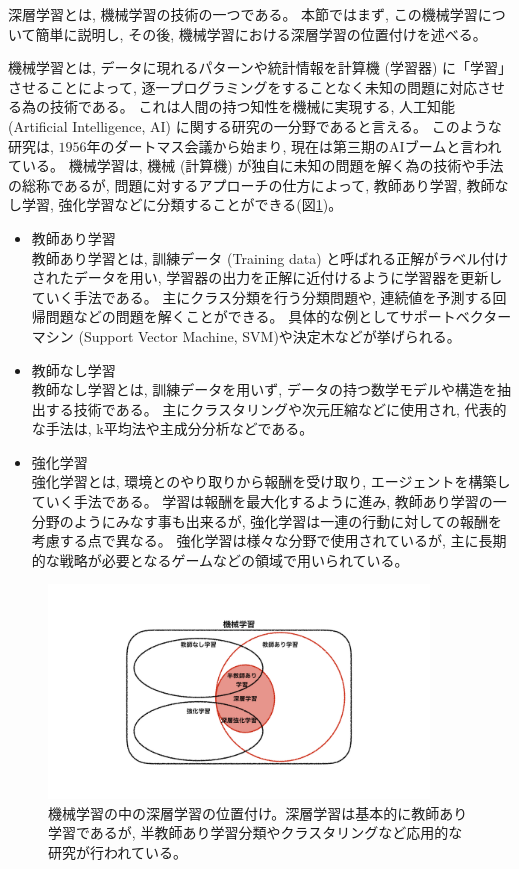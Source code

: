 深層学習とは, 機械学習の技術の一つである。
本節ではまず, この機械学習について簡単に説明し, その後, 機械学習における深層学習の位置付けを述べる。

機械学習とは, データに現れるパターンや統計情報を計算機 (学習器) に「学習」させることによって, 逐一プログラミングをすることなく未知の問題に対応させる為の技術である。
これは人間の持つ知性を機械に実現する, 人工知能 (Artificial Intelligence, AI) に関する研究の一分野であると言える。
このような研究は, $1956$年のダートマス会議\cite{Dartmouth}から始まり, 現在は第三期のAIブームと言われている。
機械学習は, 機械 (計算機) が独自に未知の問題を解く為の技術や手法の総称であるが, 問題に対するアプローチの仕方によって, 教師あり学習, 教師なし学習, 強化学習などに分類することができる(図\ref{1MachineLearning})。

\begin{itemize}
  \item 教師あり学習\\
  教師あり学習とは, 訓練データ (Training data) と呼ばれる正解がラベル付けされたデータを用い, 学習器の出力を正解に近付けるように学習器を更新していく手法である。
  主にクラス分類を行う分類問題や, 連続値を予測する回帰問題などの問題を解くことができる。
  具体的な例としてサポートベクターマシン (Support Vector Machine, SVM\cite{PatternRecognitionUsingGeneralizedPortraitMethod,TrainingAlgorithmforOptimalMarginClassifiers})や決定木などが挙げられる。
  \item 教師なし学習\\
  教師なし学習とは, 訓練データを用いず, データの持つ数学モデルや構造を抽出する技術である。
  主にクラスタリングや次元圧縮などに使用され, 代表的な手法は, k平均法や主成分分析などである。
  \item 強化学習\\
  強化学習とは, 環境とのやり取りから報酬を受け取り, エージェントを構築していく手法である。
  学習は報酬を最大化するように進み, 教師あり学習の一分野のようにみなす事も出来るが, 強化学習は一連の行動に対しての報酬を考慮する点で異なる。
  強化学習は様々な分野で使用されているが, 主に長期的な戦略が必要となるゲームなどの領域で用いられている。
\end{itemize}

\begin{figure}[htbp]
 \centering
 \includegraphics[trim = 0 100 0 50, width=0.9\textwidth, clip]{Figure/2DeepLearning/1MachineLearning.png}
 \caption[機械学習の中の深層学習の位置付け]{機械学習の中の深層学習の位置付け。深層学習は基本的に教師あり学習であるが, 半教師あり学習分類やクラスタリングなど応用的な研究が行われている。}
 \label{1MachineLearning}
\end{figure}

